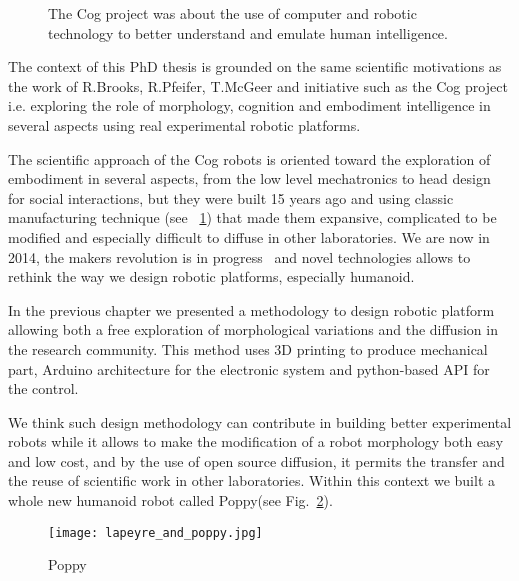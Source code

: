 

\begin{figure}[t]
\centering
    \hfil
    \caption{The Cog project was about the use of computer and robotic technology to better understand and emulate human intelligence.}
    \label{fig:cog_project}
\end{figure}



The context of this PhD thesis is grounded on the same scientific motivations as the work of R.Brooks, R.Pfeifer, T.McGeer and initiative such as the Cog project i.e. exploring the role of morphology, cognition and embodiment intelligence in several aspects using real experimental robotic platforms.

The scientific approach of the Cog robots is oriented toward the exploration of embodiment in several aspects, from the low level mechatronics to head design for social interactions, but they were built 15 years ago and using classic manufacturing technique (see \figurename~\ref{fig:cog_project}) that made them expansive, complicated to be modified and especially difficult to diffuse in other laboratories.
We are now in 2014, the makers revolution is in progress~\cite{anderson} and novel technologies allows to rethink the way we design robotic platforms, especially humanoid.

In the previous chapter we presented a methodology to design robotic platform allowing both a free exploration of morphological variations and the diffusion in the research community. This method uses 3D printing to produce mechanical part, Arduino architecture for the electronic system and python-based API for the control.

We think such design methodology can contribute in building better experimental robots while it allows to make the modification of a robot morphology both easy and low cost, and by the use of open source diffusion, it permits the transfer and the reuse of scientific work in other laboratories.
Within this context we built a whole new humanoid robot called Poppy\texttrademark (see Fig.~\ref{fig:poppy_with_me}).

\begin{figure}[tb]
    \begin{center}
        \texttt{[image: lapeyre\_and\_poppy.jpg]}
    \end{center}
    \caption{Poppy}
    \label{fig:poppy_with_me}
\end{figure}


